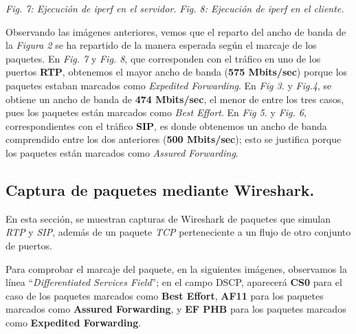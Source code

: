 \documentclass[11pt]{article}
\begin{document}
\begin{itemize}
\begin{center}
\textit{Fig. 7: Ejecución de \textit{iperf} en el \textit{servidor}.}
\hspace{0.5cm}
\textit{Fig. 8: Ejecución de \textit{iperf} en el \textit{cliente}.}
\end{center}
\end{itemize}


Observando las imágenes anteriores, vemos que el reparto del ancho de banda de la \textit{Figura 2} se ha repartido de la manera esperada según el marcaje de los paquetes. En \textit{Fig. 7} y \textit{Fig. 8}, que corresponden con el tráfico en uno de los puertos \textbf{RTP}, obtenemos el mayor ancho de banda (\textbf{575 Mbits/sec}) porque los paquetes estaban marcados como \textit{Expedited Forwarding}. En \textit{Fig 3.} y \textit{Fig.4}, se obtiene un ancho de banda de \textbf{474 Mbits/sec}, el menor de entre los tres casos, pues los paquetes están marcados como \textit{Best Effort}. En \textit{Fig 5.} y \textit{Fig. 6}, correspondientes con el tráfico \textbf{SIP}, es donde obtenemos un ancho de banda comprendido entre los dos anteriores (\textbf{500 Mbits/sec}); esto se justifica porque los paquetes están marcados como \textit{Assured Forwarding}.
\newpage

\subsection{Captura de paquetes mediante Wireshark.}
En esta sección, se muestran capturas de Wireshark de paquetes que simulan \textit{RTP} y \textit{SIP}, además de un paquete \textit{TCP} perteneciente a un flujo de otro conjunto de puertos.

Para comprobar el marcaje del paquete, en la siguientes imágenes, observamos la línea ``\textit{Differentiated Services Field}'';
en el campo DSCP, aparecerá \textbf{CS0} para el caso de los paquetes marcados como \textbf{Best Effort}, \textbf{AF11} para los paquetes marcados como \textbf{Assured Forwarding}, y \textbf{EF PHB} para los paquetes marcados como \textbf{Expedited Forwarding}.
\end{document}
